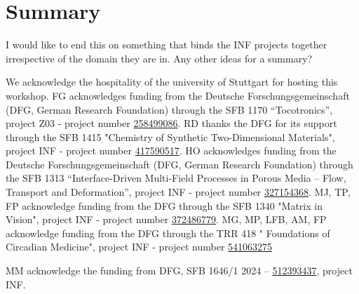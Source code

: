\documentclass{eceasst}
\newcommand{\geprislink}[1]{\href{https://gepris.dfg.de/gepris/projekt/#1?language=en}{#1}}
\begin{document}
\section{Summary}
I would like to end this on something that binds the INF projects together irrespective of the domain they are in.
Any other ideas for a summary?

\begin{acknowledge}
We acknowledge the hospitality of the university of Stuttgart for hosting this workshop.
FG acknowledges funding from the Deutsche Forschungsgemeinschaft (DFG, German Research Foundation) through the SFB 1170 “Tocotronics”, project Z03 - project number \geprislink{258499086}.
RD thanks the DFG for its support through the SFB 1415 "Chemistry of Synthetic Two-Dimensional Materials", project INF - project number \geprislink{417590517}.
HO acknowledges funding from the Deutsche Forschungsgemeinschaft (DFG, German Research Foundation) through the SFB 1313 “Interface-Driven Multi-Field Processes in Porous Media – Flow, Transport and Deformation”, project INF - project number \geprislink{327154368}.
MJ, TP, FP acknowledge funding from the DFG through the SFB 1340 "Matrix in Vision", project INF - project number \geprislink{372486779}.
MG, MP, LFB, AM, FP acknowledge funding from the DFG through the TRR 418 " Foundations of Circadian Medicine", project INF - project number \geprislink{541063275}

MM acknowledge the funding from DFG, SFB 1646/1 2024 -- \geprislink{512393437}, project INF. 

\end{acknowledge}



\end{document}
